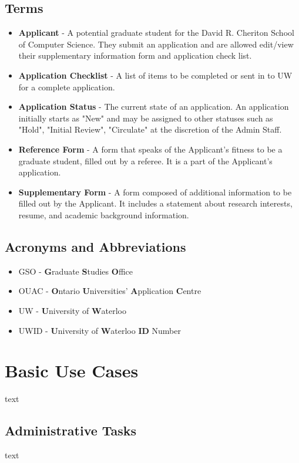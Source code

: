 \documentclass[titlepage]{article}
\begin{document}
\subsection{Terms}
\begin{itemize}
\item \textbf{Applicant} - A potential graduate student for the David R.
Cheriton School of Computer Science. They submit an application and are
allowed edit/view their supplementary information form and application check
list.
\item \textbf{Application Checklist} - A list of items to be completed or sent
in to UW for a complete application.
\item \textbf{Application Status} - The current state of an application. An
application initially starts as "New" and may be assigned to other statuses
such as "Hold", "Initial Review", "Circulate" at the discretion of the Admin
Staff.
\item \textbf{Reference Form} - A form that speaks of the Applicant's fitness
to be a graduate student, filled out by a referee. It is a part of the
Applicant's application.
\item \textbf{Supplementary Form} - A form composed of additional information
to be filled out by the Applicant.  It includes a statement about research
interests, resume, and academic background information.
\end{itemize}
\subsection{Acronyms and Abbreviations}
\begin{itemize}
\item GSO - \textbf{G}raduate \textbf{S}tudies \textbf{O}ffice
\item OUAC - \textbf{O}ntario \textbf{U}niversities' \textbf{A}pplication
\textbf{C}entre
\item UW - \textbf{U}niversity of \textbf{W}aterloo
\item UWID - \textbf{U}niversity of \textbf{W}aterloo \textbf{ID} Number
\end{itemize}


\section{Basic Use Cases}
text
\subsection{Administrative Tasks}
text
\end{document}
